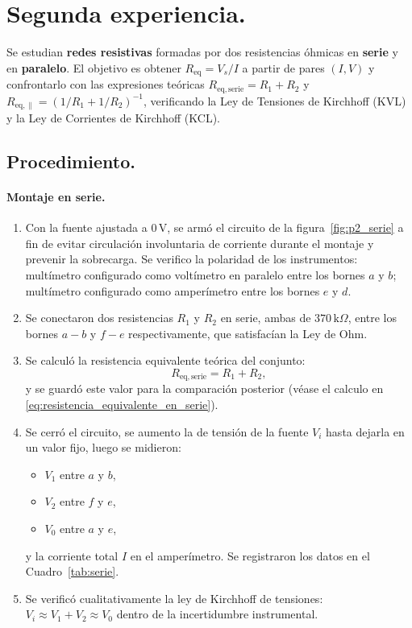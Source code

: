 \documentclass[11pt,twocolumn]{article}
\begin{document}
\section{Segunda experiencia.}

Se estudian \textbf{redes resistivas} formadas por dos resistencias óhmicas en \textbf{serie} y en \textbf{paralelo}. El objetivo es obtener \(R_{\mathrm{eq}}=V_s/I\) a partir de pares \((I,V)\) y confrontarlo con las expresiones teóricas \(R_{\mathrm{eq,serie}}=R_1+R_2\) y \(R_{\mathrm{eq,\parallel}}=(1/R_1+1/R_2)^{-1}\), verificando la Ley de Tensiones de Kirchhoff (KVL) y la Ley de Corrientes de Kirchhoff (KCL).


\subsection{Procedimiento.}\label{sec:proc2}
\paragraph{Montaje en serie.}
\begin{enumerate}[leftmargin=*,itemsep=2pt,topsep=2pt]
  \item Con la fuente ajustada a $0\,\mathrm{V}$, se armó el circuito de la figura~\ref{fig:p2_serie} a fin de evitar circulación involuntaria de corriente durante el montaje y prevenir la sobrecarga. Se verifico la polaridad de los instrumentos: multímetro configurado como voltímetro en paralelo entre los bornes $a$ y $b$; multímetro configurado como amperímetro entre los bornes $e$ y $d$.
  
  \item Se conectaron dos resistencias $R_1$ y $R_2$ en serie, ambas de $370\,\mathrm{k}\Omega$, entre los bornes $a-b$ y $f-e$ respectivamente, que satisfacían la Ley de Ohm.
  
  \item Se calculó la resistencia equivalente teórica del conjunto:
        \begin{equation*}
            R_{\mathrm{eq,serie}}=R_1+R_2,
        \end{equation*}
        y se guardó este valor para la comparación posterior (véase el calculo en \eqref{eq:resistencia_equivalente_en_serie}).
  \item Se cerró el circuito, se aumento la de tensión de la fuente $V_i$  hasta dejarla en un valor fijo, luego se midieron:
  \begin{itemize}
      \item $V_1$ entre $a$ y $b$,
      \item $V_2$ entre $f$ y $e$,
      \item $V_0$ entre $a$ y $e$,
  \end{itemize} 
        y la corriente total $I$ en el amperímetro.
        Se registraron los datos en el Cuadro~\ref{tab:serie}.
  \item Se verificó cualitativamente la ley de Kirchhoff de tensiones: $V_i \approx V_1+V_2\approx V_0$ dentro de la incertidumbre instrumental.
\end{enumerate}
\end{document}
